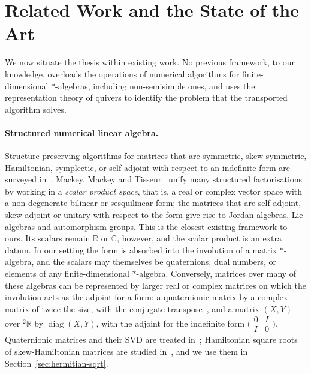 \documentclass[12pt, a4paper]{report}
\theoremstyle{plain}
\theoremstyle{definition}
\theoremstyle{remark}
\theoremstyle{plain}
\newcommand{\RR}{\mathbb{R}}
\newcommand{\CC}{\mathbb{C}}
\newcommand{\twoR}{{}^{2}\mathbb{R}}
\DeclareMathOperator{\diag}{diag}
\begin{document}
\section{Related Work and the State of the Art}
\label{sec:related}
We now situate the thesis within existing work. No previous framework, to our knowledge, overloads the operations of numerical algorithms for finite-dimensional $*$-algebras, including non-semisimple ones, and uses the representation theory of quivers to identify the problem that the transported algorithm solves.

\paragraph{Structured numerical linear algebra.}
Structure-preserving algorithms for matrices that are symmetric, skew-symmetric, Hamiltonian, symplectic, or self-adjoint with respect to an indefinite form are surveyed in~\cite{BunseGerstnerByersMehrmann1992}. Mackey, Mackey and Tisseur~\cite{MackeyMackeyTisseur2006} unify many structured factorisations by working in a \emph{scalar product space}, that is, a real or complex vector space with a non-degenerate bilinear or sesquilinear form; the matrices that are self-adjoint, skew-adjoint or unitary with respect to the form give rise to Jordan algebras, Lie algebras and automorphism groups. This is the closest existing framework to ours. Its scalars remain $\RR$ or $\CC$, however, and the scalar product is an extra datum. In our setting the form is absorbed into the involution of a matrix $*$-algebra, and the scalars may themselves be quaternions, dual numbers, or elements of any finite-dimensional $*$-algebra. Conversely, matrices over many of these algebras can be represented by larger real or complex matrices on which the involution acts as the adjoint for a form: a quaternionic matrix by a complex matrix of twice the size, with the conjugate transpose~\cite{Zhang1997}, and a matrix $(X,Y)$ over $\twoR$ by $\diag(X,Y)$, with the adjoint for the indefinite form $\bigl(\begin{smallmatrix}0&I\\I&0\end{smallmatrix}\bigr)$. Quaternionic matrices and their SVD are treated in~\cite{Zhang1997}; Hamiltonian square roots of skew-Hamiltonian matrices are studied in~\cite{FassbenderMackeyMackeyXu1999}, and we use them in Section~\ref{sec:hermitian-sqrt}.
\end{document}
